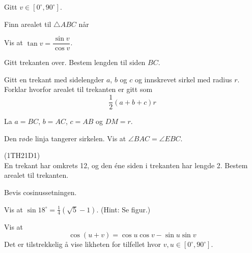 




\opgt

Gitt $ v\in [0^\circ, 90^\circ] $.

Finn arealet til $ \triangle ABC $ når



Vis at $ \tan v = \dfrac{\sin v}{\cos v}  $.

\newpage
\nes

Gitt trekanten over. Bestem lengden til siden $ BC $.

Gitt en trekant med sidelengder $ a $, $ b $ og $ c $ og innskrevet sirkel med radius $ r $. Forklar hvorfor arealet til trekanten er gitt som 
\[ \frac{1}{2}(a+b+c)r \]

La $ a=BC $, $ b=AC $, $ c=AB $ og $ DM=r $.

Den røde linja tangerer sirkelen. Vis at $ \angle BAC=\angle EBC $.
\newpage

 (1TH21D1)\\ %
En trekant har omkrets 12, og den éne siden i trekanten har lengde 2. Bestem arealet til trekanten.

Bevis cosinussetningen.

Vis at $ \sin 18^\circ=\frac{1}{4}(\sqrt{5}-1) $. (Hint: Se figur.)

Vis at
\[ \cos(u+v)= \cos u\cos v-\sin u \sin v \]
Det er tilstrekkelig å vise likheten for tilfellet hvor $ v,u \in [0^\circ, 90^\circ] $.



